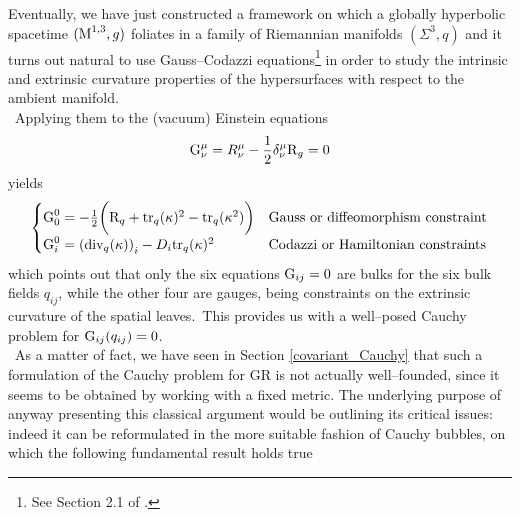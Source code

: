 Eventually, we have just constructed a framework on which a globally hyperbolic spacetime $(\text{\normalfont M}^{1,3},g)$ foliates in a family of Riemannian manifolds $(\Sigma^3,q)$ and it turns out natural to use Gauss--Codazzi equations\footnote{See Section 2.1 of \cite{lee}.} in order to study the intrinsic and extrinsic curvature properties of the hypersurfaces with respect to the ambient manifold.\\
\,\newline
Applying them to the (vacuum) Einstein equations %
$$\text{\normalfont G}^\mu_\nu=R^\mu_\nu-\frac{1}{2}\delta^\mu_\nu\text{\normalfont R}_g=0$$
yields
$$\begin{cases}
    \text{\normalfont G}^0_0=-\frac{1}{2}\bigg(\text{\normalfont R}_q+\text{\normalfont tr}_q(\kappa)^2-\text{\normalfont tr}_q(\kappa^2)\bigg) &\text{Gauss or diffeomorphism constraint}\\
    \text{\normalfont G}^0_i=\left(\text{\normalfont div}_q(\kappa)\right)_i-D_i\text{\normalfont tr}_q(\kappa)^2 &\text{Codazzi or Hamiltonian constraints}
\end{cases}$$
which points out that only the six equations $\text{\normalfont G}_{ij}=0$ are bulks for the six bulk fields $q_{ij}$, while the other four are gauges, being constraints on the extrinsic curvature of the spatial leaves.\, This provides us with a well--posed Cauchy problem for $\text{\normalfont G}_{ij}(q_{ij})=0$.\\
\,\newline
As a matter of fact, we have seen in Section \ref{covariant_Cauchy} that such a formulation of the Cauchy problem for GR is not actually well--founded, since it seems to be obtained by working with a fixed metric. The underlying purpose of anyway presenting this classical argument would be outlining its critical issues: indeed it can be reformulated in the more suitable fashion of Cauchy bubbles, on which the following fundamental result holds true



